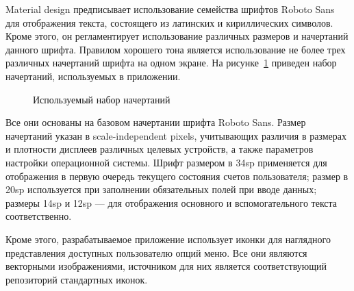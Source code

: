 Material design предписывает использование семейства шрифтов
Roboto Sans для отображения текста, состоящего из латинских
и кириллических символов. Кроме этого, он регламентирует
использование различных размеров и начертаний данного шрифта.
Правилом хорошего тона является использование не более трех
различных начертаний шрифта на одном экране.
На рисунке~\ref{fig:design_fonts} приведен набор начертаний,
используемых в приложении.

\begin{figure}[h!]
  \centering
  \caption{Используемый набор начертаний}
  \label{fig:design_fonts}
\end{figure}

Все они основаны на базовом начертании шрифта Roboto Sans.
Размер начертаний указан в scale-independent pixels, учитывающих различия
в размерах и плотности дисплеев различных целевых устройств,
а также параметров настройки операционной системы.
Шрифт размером в 34sp применяется для отображения в первую очередь
текущего состояния счетов пользователя;
размер в 20sp используется при заполнении обязательных полей при вводе данных;
размеры 14sp и 12sp --- для отображения основного и вспомогательного текста
соответственно.

Кроме этого, разрабатываемое приложение использует иконки для
наглядного представления доступных пользователю опций меню.
Все они являются векторными изображениями, источником для них
является соответствующий репозиторий стандартных иконок.